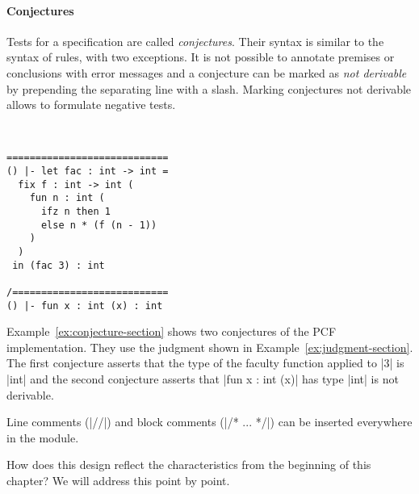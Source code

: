 \paragraph{Conjectures} Tests for a specification are called
\textit{conjectures}. Their syntax is similar to the syntax of rules,
with two exceptions. It is not possible to annotate premises or
conclusions with error messages and a conjecture can be marked as
\textit{not derivable} by prepending the separating line with a
slash. Marking conjectures not derivable allows to formulate negative
tests.

\begin{example}{~}
\begin{lstlisting}[language=sltc]
============================
() |- let fac : int -> int = 
  fix f : int -> int (
    fun n : int (
      ifz n then 1 
      else n * (f (n - 1))
    )
  )
 in (fac 3) : int

/===========================
() |- fun x : int (x) : int
\end{lstlisting}
\label{ex:conjecture-section}
\end{example}

Example~\ref{ex:conjecture-section} shows two conjectures of the PCF
implementation. They use the judgment shown in
Example~\ref{ex:judgment-section}. The first conjecture asserts that
the type of the faculty function applied to \code|3| is \code|int| and
the second conjecture asserts that \code|fun x : int (x)| has type
\code|int| is not derivable.

Line comments (\code|//|) and block comments (\code|/* ... */|) can be
inserted everywhere in the module.

How does this design reflect the characteristics from the beginning of
this chapter? We will address this point by point.

